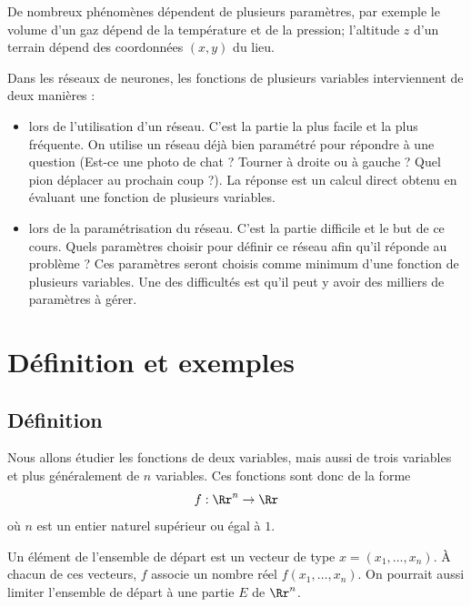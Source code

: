De nombreux phénomènes dépendent de plusieurs paramètres, par exemple le volume d'un gaz dépend de la température et de la pression; l'altitude $z$ d'un terrain dépend des coordonnées $(x,y)$ du lieu.

Dans les réseaux de neurones, les fonctions de plusieurs variables interviennent de deux manières :
\begin{itemize}
	\item lors de l'utilisation d'un réseau. C'est la partie la plus facile et la plus fréquente. On utilise un réseau déjà bien paramétré pour répondre à une question (Est-ce une photo de chat ? Tourner à droite ou à gauche ? Quel pion déplacer au prochain coup ?). La réponse est un calcul direct obtenu en évaluant une fonction de plusieurs variables. 
	
	\item lors de la paramétrisation du réseau. C'est la partie difficile et le but de ce cours. Quels paramètres choisir pour définir ce réseau afin qu'il réponde au problème ? Ces paramètres seront choisis comme minimum d'une fonction de plusieurs variables. Une des difficultés est qu'il peut y avoir des milliers de paramètres à gérer.
	
\end{itemize}



\section{Définition et exemples}

\subsection{Définition}


Nous allons étudier les fonctions de deux variables, mais aussi de trois variables et plus généralement de $n$ variables.
Ces fonctions sont donc de la forme 
$$f : \Rr^n \rightarrow \Rr$$
où $n$ est un entier naturel supérieur ou égal à $1$. 


Un élément de l'ensemble de départ est un vecteur de type  $x = (x_1,\ldots,x_n)$. À chacun de ces vecteurs, $f$ associe un nombre réel $f(x_1,\ldots,x_n)$. On pourrait aussi limiter l'ensemble de départ à une partie $E$ de $ \Rr^n$.



